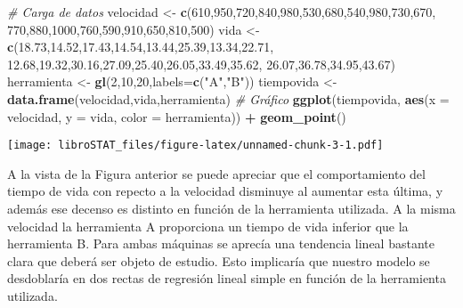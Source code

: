 \documentclass[
]{book}
\newenvironment{Shaded}{\begin{snugshade}}{\end{snugshade}}
\newcommand{\CommentTok}[1]{\textcolor[rgb]{0.56,0.35,0.01}{\textit{#1}}}
\newcommand{\DataTypeTok}[1]{\textcolor[rgb]{0.13,0.29,0.53}{#1}}
\newcommand{\DecValTok}[1]{\textcolor[rgb]{0.00,0.00,0.81}{#1}}
\newcommand{\FloatTok}[1]{\textcolor[rgb]{0.00,0.00,0.81}{#1}}
\newcommand{\KeywordTok}[1]{\textcolor[rgb]{0.13,0.29,0.53}{\textbf{#1}}}
\newcommand{\NormalTok}[1]{#1}
\newcommand{\OperatorTok}[1]{\textcolor[rgb]{0.81,0.36,0.00}{\textbf{#1}}}
\newcommand{\StringTok}[1]{\textcolor[rgb]{0.31,0.60,0.02}{#1}}
\theoremstyle{definition}
\theoremstyle{definition}
\theoremstyle{definition}
\theoremstyle{remark}
\begin{document}
\begin{Shaded}
\begin{Highlighting}[]
\CommentTok{# Carga de datos}
\NormalTok{velocidad <-}\StringTok{ }\KeywordTok{c}\NormalTok{(}\DecValTok{610}\NormalTok{,}\DecValTok{950}\NormalTok{,}\DecValTok{720}\NormalTok{,}\DecValTok{840}\NormalTok{,}\DecValTok{980}\NormalTok{,}\DecValTok{530}\NormalTok{,}\DecValTok{680}\NormalTok{,}\DecValTok{540}\NormalTok{,}\DecValTok{980}\NormalTok{,}\DecValTok{730}\NormalTok{,}\DecValTok{670}\NormalTok{,}
             \DecValTok{770}\NormalTok{,}\DecValTok{880}\NormalTok{,}\DecValTok{1000}\NormalTok{,}\DecValTok{760}\NormalTok{,}\DecValTok{590}\NormalTok{,}\DecValTok{910}\NormalTok{,}\DecValTok{650}\NormalTok{,}\DecValTok{810}\NormalTok{,}\DecValTok{500}\NormalTok{)}
\NormalTok{vida <-}\StringTok{ }\KeywordTok{c}\NormalTok{(}\FloatTok{18.73}\NormalTok{,}\FloatTok{14.52}\NormalTok{,}\FloatTok{17.43}\NormalTok{,}\FloatTok{14.54}\NormalTok{,}\FloatTok{13.44}\NormalTok{,}\FloatTok{25.39}\NormalTok{,}\FloatTok{13.34}\NormalTok{,}\FloatTok{22.71}\NormalTok{,}
          \FloatTok{12.68}\NormalTok{,}\FloatTok{19.32}\NormalTok{,}\FloatTok{30.16}\NormalTok{,}\FloatTok{27.09}\NormalTok{,}\FloatTok{25.40}\NormalTok{,}\FloatTok{26.05}\NormalTok{,}\FloatTok{33.49}\NormalTok{,}\FloatTok{35.62}\NormalTok{,}
          \FloatTok{26.07}\NormalTok{,}\FloatTok{36.78}\NormalTok{,}\FloatTok{34.95}\NormalTok{,}\FloatTok{43.67}\NormalTok{)}
\NormalTok{herramienta <-}\StringTok{ }\KeywordTok{gl}\NormalTok{(}\DecValTok{2}\NormalTok{,}\DecValTok{10}\NormalTok{,}\DecValTok{20}\NormalTok{,}\DataTypeTok{labels=}\KeywordTok{c}\NormalTok{(}\StringTok{"A"}\NormalTok{,}\StringTok{"B"}\NormalTok{))}
\NormalTok{tiempovida <-}\StringTok{ }\KeywordTok{data.frame}\NormalTok{(velocidad,vida,herramienta)}
\CommentTok{# Gráfico}
\KeywordTok{ggplot}\NormalTok{(tiempovida, }\KeywordTok{aes}\NormalTok{(}\DataTypeTok{x =}\NormalTok{ velocidad, }\DataTypeTok{y =}\NormalTok{ vida, }\DataTypeTok{color =}\NormalTok{ herramienta)) }\OperatorTok{+}\StringTok{ }
\StringTok{  }\KeywordTok{geom_point}\NormalTok{() }
\end{Highlighting}
\end{Shaded}

\texttt{[image: libroSTAT\_files/figure-latex/unnamed-chunk-3-1.pdf]}

A la vista de la Figura anterior se puede apreciar que el comportamiento del tiempo de vida con repecto a la velocidad disminuye al aumentar esta última, y además ese decenso es distinto en función de la herramienta utilizada. A la misma velocidad la herramienta A proporciona un tiempo de vida inferior que la herramienta B. Para ambas máquinas se aprecía una tendencia lineal bastante clara que deberá ser objeto de estudio. Esto implicaría que nuestro modelo se desdoblaría en dos rectas de regresión lineal simple en función de la herramienta utilizada.
\end{document}
